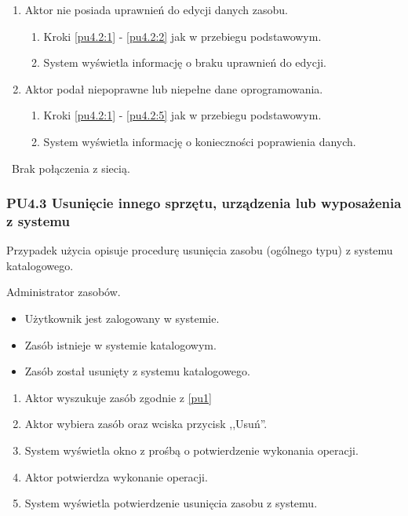 \begin{enumerate}
\item Aktor nie posiada uprawnień do edycji danych zasobu.
	\begin{enumerate}[label*=\arabic*.]
		\item Kroki \ref{pu4.2:1} - \ref{pu4.2:2} jak w przebiegu podstawowym.
		\item System wyświetla informację o braku uprawnień do edycji.
	\end{enumerate}
\item Aktor podał niepoprawne lub niepełne dane oprogramowania.
	\begin{enumerate}[label*=\arabic*.]
		\item Kroki \ref{pu4.2:1} - \ref{pu4.2:5} jak w przebiegu podstawowym.
		\item System wyświetla informację o konieczności poprawienia danych.
	\end{enumerate}
\end{enumerate}

\
Brak połączenia z siecią.

\subsubsection{PU4.3 Usunięcie innego sprzętu, urządzenia lub wyposażenia z systemu}

Przypadek użycia opisuje procedurę usunięcia zasobu (ogólnego typu) z systemu katalogowego.

Administrator zasobów.

\begin{itemize}
\item Użytkownik jest zalogowany w systemie.
\item Zasób istnieje w systemie katalogowym.
\end{itemize}

\begin{itemize}
\item Zasób został usunięty z systemu katalogowego.
\end{itemize}

\begin{enumerate}
\item \label{pu4.3:1} Aktor wyszukuje zasób zgodnie z \ref{pu1}
\item \label{pu4.3:2} Aktor wybiera zasób oraz wciska przycisk ,,Usuń''.
\item System wyświetla okno z prośbą o potwierdzenie wykonania operacji.
\item Aktor potwierdza wykonanie operacji.
\item System wyświetla potwierdzenie usunięcia zasobu z systemu.
\end{enumerate}

